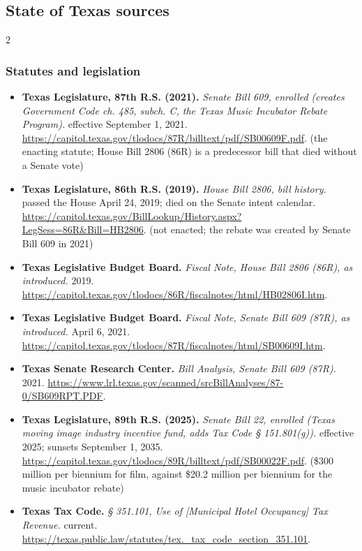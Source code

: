 \subsection*{State of Texas sources}
{\scriptsize\renewcommand{\baselinestretch}{0.88}\selectfont\raggedright
\begin{multicols}{2}
\setlength{\parskip}{0pt}
\subsubsection*{Statutes and legislation}
\begin{itemize}[itemsep=0pt,topsep=1pt,parsep=0pt,partopsep=0pt,leftmargin=1em]
\item \textbf{Texas Legislature, 87th R.S. (2021).} \textit{Senate Bill 609, enrolled (creates Government Code ch. 485, subch. C, the Texas Music Incubator Rebate Program).} effective September 1, 2021. \url{https://capitol.texas.gov/tlodocs/87R/billtext/pdf/SB00609F.pdf}. {\color{ammuted}(the enacting statute; House Bill 2806 (86R) is a predecessor bill that died without a Senate vote)}
\item \textbf{Texas Legislature, 86th R.S. (2019).} \textit{House Bill 2806, bill history.} passed the House April 24, 2019; died on the Senate intent calendar. \url{https://capitol.texas.gov/BillLookup/History.aspx?LegSess=86R&Bill=HB2806}. {\color{ammuted}(not enacted; the rebate was created by Senate Bill 609 in 2021)}
\item \textbf{Texas Legislative Budget Board.} \textit{Fiscal Note, House Bill 2806 (86R), as introduced.} 2019. \url{https://capitol.texas.gov/tlodocs/86R/fiscalnotes/html/HB02806I.htm}.
\item \textbf{Texas Legislative Budget Board.} \textit{Fiscal Note, Senate Bill 609 (87R), as introduced.} April 6, 2021. \url{https://capitol.texas.gov/tlodocs/87R/fiscalnotes/html/SB00609I.htm}.
\item \textbf{Texas Senate Research Center.} \textit{Bill Analysis, Senate Bill 609 (87R).} 2021. \url{https://www.lrl.texas.gov/scanned/srcBillAnalyses/87-0/SB609RPT.PDF}.
\item \textbf{Texas Legislature, 89th R.S. (2025).} \textit{Senate Bill 22, enrolled (Texas moving image industry incentive fund, adds Tax Code § 151.801(g)).} effective 2025; sunsets September 1, 2035. \url{https://capitol.texas.gov/tlodocs/89R/billtext/pdf/SB00022F.pdf}. {\color{ammuted}(\$300 million per biennium for film, against \$20.2 million per biennium for the music incubator rebate)}
\item \textbf{Texas Tax Code.} \textit{§ 351.101, Use of [Municipal Hotel Occupancy] Tax Revenue.} current. \url{https://texas.public.law/statutes/tex._tax_code_section_351.101}.
\end{itemize}

\end{multicols}}
